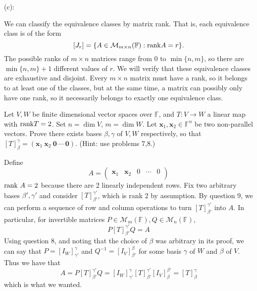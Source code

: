 \documentclass{eh-homework}
\begin{document}
\begin{question}{9}
        \medskip

        (c):

        We can classify the equivalence classes by matrix rank. That is, each equivalence class is of the form
        \[
            [J_r] = \{ A \in \mathcal{M} _{m\times n}(\mathbb{F}) : \mathrm{rank} A = r\}.
        \]
        The possible ranks of \(m\times n\) matrices range from \(0\) to \(\min \{ n,m \}\), so there are \(\min \{ n,m \} + 1\) different values of \(r\). We will verify that these equivalence classes are exhaustive and disjoint. Every \(m \times n\) matrix must have a rank, so it belongs to at least one of the classes, but at the same time, a matrix can possibly only have one rank, so it necessarily belongs to exactly one equivalence class.
    \end{question}
    \newpage
    \begin{question}{10}
        Let \( V, W \) be finite dimensional vector spaces over \( \mathbb{F} \), and \( T : V \to W \) a linear map with \(\mathrm{rank} T = 2\). Set \( n = \dim V \), \( m = \dim W \). Let \( \mathbf{x}_1, \mathbf{x}_2 \in \mathbb{F}^n \) be two non-parallel vectors. Prove there exists bases \( \beta, \gamma \) of \( V, W \) respectively, so that \( [T]_\beta^\gamma = (\mathbf{x}_1 \ \mathbf{x}_2 \ \mathbf{0} \ \cdots \ \mathbf{0}) \). (Hint: use problems 7,8.)

        \tcblower

        Define
        \[
            A = \begin{pmatrix}
                \mathbf{x}_1 & \mathbf{x}_2 & 0 & \cdots &  0 \\
            \end{pmatrix}
        \]
        \(\mathrm{rank} \ A = 2\) because there are 2 linearly independent rows. Fix two arbitrary bases \(\beta', \gamma'\) and consider \([T]_{\beta'}^{\gamma'}\), which is rank 2 by assumption. By question 9, we can perform a sequence of row and column operations to turn \([T]_{\beta'}^{\gamma'}\) into \(A\). In particular, for invertible matrices \(P \in \mathcal{M} _m(\mathbb{F}), Q \in \mathcal{M} _n(\mathbb{F})\),
        \[
            P [T]_{\beta'}^{\gamma'} Q = A
        \]
        Using question 8, and noting that the choice of \(\beta\) was arbitrary in its proof, we can say that \(P = [I_W]_{\gamma'}^\gamma\) and \(Q^{-1} = [I_V]_{\beta'}^\beta\) for some basis \(\gamma\) of \(W\) and \(\beta\) of \(V\). Thus we have that
        \[
            A = P [T]_{\beta'}^{\gamma'} Q = [I_W]_{\gamma'}^\gamma [T]_{\beta'}^{\gamma'} [I_V]_{\beta}^{\beta'} = [T]_\beta^\gamma
        \]
        which is what we wanted.
    \end{question}
\end{document}
